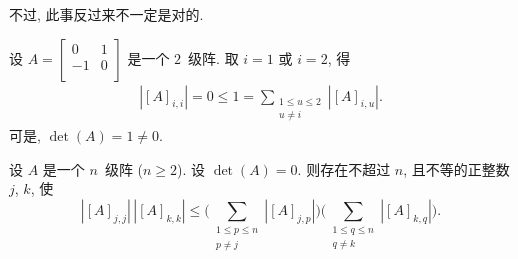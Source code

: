 \documentclass[../libro.tex]{subfiles}
\begin{document}
不过, 此事反过来不一定是对的.

\begin{example}
    设 \(A =
        \begin{bmatrix}
            0  & 1 \\
            -1 & 0 \\
    \end{bmatrix}\)
    是一个 \(2\)~级阵.
    取 \(i = 1\) 或 \(i = 2\), 得
    \begin{align*}
        |[A]_{i,i}|
        = 0
        \leq 1
        = \sum_{\substack{1 \leq u \leq 2 \\ u \neq i}} {|[A]_{i,u}|}.
    \end{align*}
    可是, \(\det {(A)} = 1 \neq 0\).
\end{example}

\begin{theorem}
    设 \(A\) 是一个 \(n\)~级阵 (\(n \geq 2\)).
    设 \(\det {(A)} = 0\).
    则存在不超过 \(n\), 且不等的正整数 \(j\), \(k\), 使
    \begin{equation}
        |[A]_{j,j}|\,|[A]_{k,k}| \leq
        \Bigg(
            \sum_{\substack{1 \leq p \leq n \\
            p \neq j}} {|[A]_{j,p}|}
        \Bigg)
        \Bigg(
            \sum_{\substack{1 \leq q \leq n \\
            q \neq k}} {|[A]_{k,q}|}
        \Bigg).
        \label{eq:NonzeroDet2}
    \end{equation}
\end{theorem}
\end{document}
